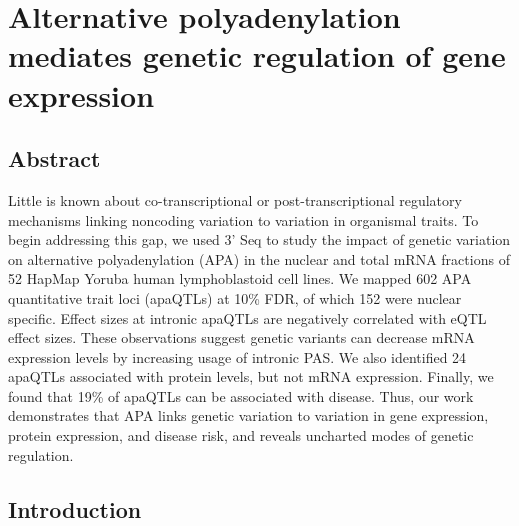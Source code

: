 \chapter{Alternative polyadenylation mediates genetic regulation of gene expression}\label{ch:QTL}
\section[Abstract]{Abstract\footnotemark}



Little is known about co-transcriptional or post-transcriptional regulatory mechanisms linking noncoding variation to variation in organismal traits. To begin addressing this gap, we used 3' Seq to study the impact of genetic variation on alternative polyadenylation (APA) in the nuclear and total mRNA fractions of 52 HapMap Yoruba human lymphoblastoid cell lines. We mapped 602 APA quantitative trait loci (apaQTLs) at 10\% FDR, of which 152 were nuclear specific. Effect sizes at intronic apaQTLs are negatively correlated with eQTL effect sizes. These observations suggest genetic variants can decrease mRNA expression levels by increasing usage of intronic PAS. We also identified 24 apaQTLs associated with protein levels, but not mRNA expression. Finally, we found that 19\% of apaQTLs can be associated with disease. Thus, our work demonstrates that APA links genetic variation to variation in gene expression, protein expression, and disease risk, and reveals uncharted modes of genetic regulation.



\clearpage


\section{Introduction}\label{ch02-introduction}

